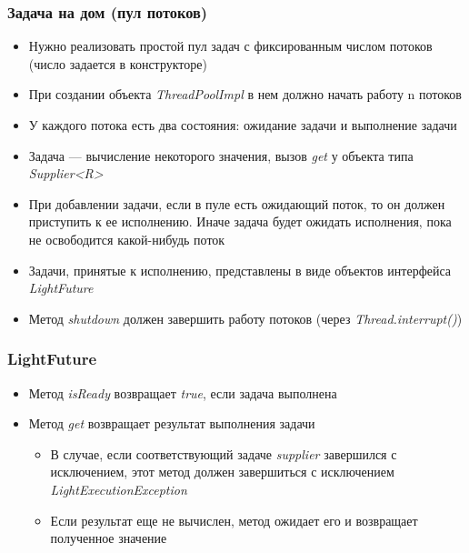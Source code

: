 \documentclass[xetex,mathserif,serif]{beamer}
\begin{document}
	\begin{frame}
		\frametitle{Задача на дом (пул потоков)}
		\begin{itemize}
			\item Нужно реализовать простой пул задач с фиксированным числом потоков (число задается в конструкторе)
			\item При создании объекта \textit{ThreadPoolImpl} в нем должно начать работу n потоков
			\item У каждого потока есть два состояния: ожидание задачи и выполнение задачи
			\item Задача --- вычисление некоторого значения, вызов \textit{get} у объекта типа \textit{Supplier<R>}
			\item При добавлении задачи, если в пуле есть ожидающий поток, то он должен приступить к ее исполнению. 
					Иначе задача будет ожидать исполнения, пока не освободится какой-нибудь поток
			\item Задачи, принятые к исполнению, представлены в виде объектов интерфейса \textit{LightFuture}
			\item Метод \textit{shutdown} должен завершить работу потоков (через \textit{Thread.interrupt()})
		\end{itemize}
	\end{frame}

	\begin{frame}
		\frametitle{LightFuture}
		\begin{itemize}
			\item Метод \textit{isReady} возвращает \textit{true}, если задача выполнена
			\item Метод \textit{get} возвращает результат выполнения задачи
			\begin{itemize}
				\item В случае, если соответствующий задаче \textit{supplier} завершился с исключением, этот метод должен завершиться с исключением \textit{LightExecutionException}
				\item Если результат еще не вычислен, метод ожидает его и возвращает полученное значение
			\end{itemize}
		\end{itemize}
	\end{frame}
\end{document}
